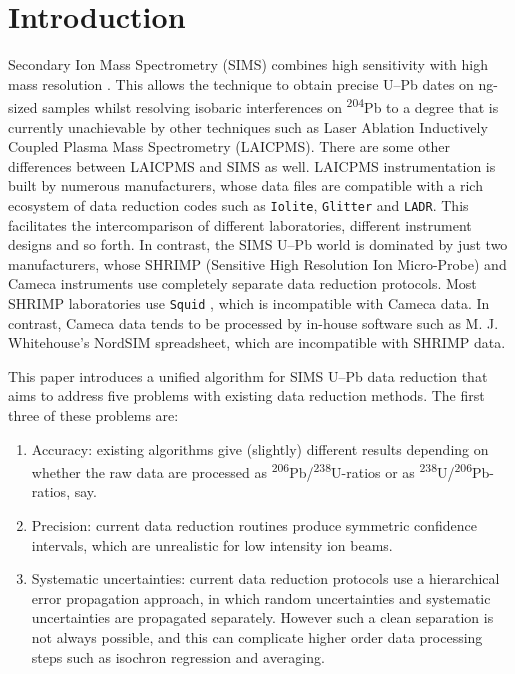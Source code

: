 \documentclass{article}
\begin{document}


\section{Introduction}  %

Secondary Ion Mass Spectrometry (SIMS) combines high sensitivity with
high mass resolution \citep{williams1998}. This allows the technique
to obtain precise U--Pb dates on ng-sized samples whilst resolving
isobaric interferences on \textsuperscript{204}Pb to a degree that is
currently unachievable by other techniques such as Laser Ablation
Inductively Coupled Plasma Mass Spectrometry (LAICPMS).  There are
some other differences between LAICPMS and SIMS as well. LAICPMS
instrumentation is built by numerous manufacturers, whose data files
are compatible with a rich ecosystem of data reduction codes such as
\texttt{Iolite}, \texttt{Glitter} and \texttt{LADR}.  This facilitates
the intercomparison of different laboratories, different instrument
designs and so forth.  In contrast, the SIMS U--Pb world is dominated
by just two manufacturers, whose SHRIMP (Sensitive High Resolution Ion
Micro-Probe) and Cameca instruments use completely separate data
reduction protocols. Most SHRIMP laboratories use \texttt{Squid}
\citep{ludwig2000,bodorkos2020}, which is incompatible with Cameca
data.  In contrast, Cameca data tends to be processed by in-house
software such as M. J. Whitehouse's NordSIM spreadsheet, which are
incompatible with SHRIMP data.\medskip

This paper introduces a unified algorithm for SIMS U--Pb data
reduction that aims to address five problems with existing data
reduction methods. The first three of these problems are:

\begin{enumerate}
\item Accuracy: existing algorithms give (slightly) different results
  depending on whether the raw data are processed as
  \textsuperscript{206}Pb/\textsuperscript{238}U-ratios or as
  \textsuperscript{238}U/\textsuperscript{206}Pb-ratios,
  say. \label{it:accuracy}
\item Precision: current data reduction routines produce symmetric
  confidence intervals, which are unrealistic for low intensity ion
  beams. \label{it:precision}
\item Systematic uncertainties: current data reduction protocols use a
  hierarchical error propagation approach, in which random
  uncertainties and systematic uncertainties are propagated
  separately. However such a clean separation is not always possible,
  and this can complicate higher order data processing steps such as
  isochron regression and averaging. \label{it:syserr}
\end{enumerate}
\end{document}
